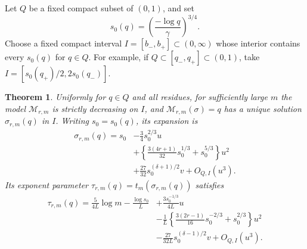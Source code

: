 \documentclass[11pt,letterpaper]{article}
\numberwithin{equation}{section}
\newtheorem{theorem}{Theorem}[section]
\theoremstyle{definition}\newtheorem{definition}[theorem]{Definition}
\theoremstyle{remark}\newtheorem{remark}[theorem]{Remark}
\newcommand{\M}{\mathcal M}
\begin{document}
Let $Q$ be a fixed compact subset of $(0,1)$, and set
\begin{equation}\label{det:grow:eq:s0}
 s_0(q)=\left(\frac{-\log q}{\gamma}\right)^{3/4}.
\end{equation}
Choose a fixed compact interval $I=[b_-,b_+]\subset(0,\infty)$ whose
interior contains every $s_0(q)$ for $q\in Q$. For example, if
$Q\subset[q_-,q_+]\subset(0,1)$, take
$I=[s_0(q_+)/2,2s_0(q_-)]$.

\begin{theorem}\label{det:grow:thm:inverse}
Uniformly for $q\in Q$ and all residues, for sufficiently large $m$ the
model $\M_{r,m}$ is strictly decreasing on $I$, and
$\M_{r,m}(\sigma)=q$ has a unique solution $\sigma_{r,m}(q)$ in $I$.
Writing $s_0=s_0(q)$, its expansion is
\begin{equation}\label{det:grow:eq:s-inverse}
\begin{aligned}
 \sigma_{r,m}(q)=s_0&-\frac34s_0^{2/3}u\\
 &+\left\{\frac{3(4r+1)}{32}s_0^{1/3}+s_0^{5/3}\right\}u^2\\
 &+\frac{27}{32}s_0^{(\delta+1)/2}v+O_{Q,I}(u^3).
\end{aligned}
\end{equation}
Its exponent parameter $\tau_{r,m}(q)=t_m(\sigma_{r,m}(q))$ satisfies
\begin{equation}\label{det:grow:eq:t-inverse}
\begin{aligned}
 \tau_{r,m}(q)=\frac5{4L}\log m-\frac{\log s_0}{L}
 &+\frac{3s_0^{-1/3}}{4L}u\\
 &-\frac1L\left\{\frac{3(2r-1)}{16}s_0^{-2/3}+s_0^{2/3}\right\}u^2\\
 &-\frac{27}{32L}s_0^{(\delta-1)/2}v+O_{Q,I}(u^3).
\end{aligned}
\end{equation}
\end{theorem}
\end{document}
